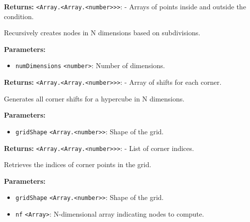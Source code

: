 \documentclass[12pt,a4paper]{article}
\begin{document}
\noindent \textbf{Returns:} \texttt{<Array.<Array.<number>>>}: - Arrays of points inside and outside the condition.

\noindent Recursively creates nodes in N dimensions based on subdivisions.

\vspace{5mm}
\noindent {}


\noindent \textbf{Parameters:}
\begin{itemize}
  \item \texttt{numDimensions} \texttt{<number>}: Number of dimensions.
\end{itemize}

\noindent \textbf{Returns:} \texttt{<Array.<Array.<number>>>}: - Array of shifts for each corner.

\noindent Generates all corner shifts for a hypercube in N dimensions.

\vspace{5mm}
\noindent {}


\noindent \textbf{Parameters:}
\begin{itemize}
  \item \texttt{gridShape} \texttt{<Array.<number>>}: Shape of the grid.
\end{itemize}

\noindent \textbf{Returns:} \texttt{<Array.<Array.<number>>>}: - List of corner indices.

\noindent Retrieves the indices of corner points in the grid.

\vspace{5mm}
\noindent {}


\noindent \textbf{Parameters:}
\begin{itemize}
  \item \texttt{gridShape} \texttt{<Array.<number>>}: Shape of the grid.
  \item \texttt{nf} \texttt{<Array>}: N-dimensional array indicating nodes to compute.
\end{itemize}
\end{document}
